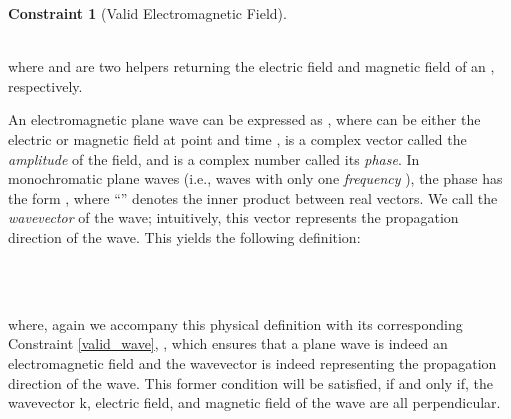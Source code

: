 \documentclass{llncs}
\newtheorem{cons}{Constraint}
\begin{document}
{\begin{cons}[Valid Electromagnetic Field]\  \\
\\
\end{cons}
 \noindent where  and  are two helpers returning the electric field and magnetic field of an , respectively. 
 	

An electromagnetic plane wave can be expressed as
,
where  can be either the electric or magnetic field at point  and time ,
 is a complex vector called the \emph{amplitude} of the field,
and  is a complex number called its \emph{phase}.
In monochromatic plane waves (i.e., waves with only one \emph{frequency} ), the phase  has the form ,
where ``'' denotes the inner product between real vectors.
We call  the \emph{wavevector} of the wave; intuitively, this vector represents the propagation direction of the wave.
This yields the following definition:
\begin{definition} 
 \label{def_planar}\ \vspace{.1cm}\ \\
\ \vspace{.1cm}\\
\end{definition}

\noindent where, again we accompany this physical definition with its corresponding Constraint \ref{valid_wave}, , which ensures that a plane wave  is indeed an electromagnetic field and the wavevector is indeed representing the propagation direction of the wave. This former condition will be satisfied, if and only if, the wavevector \hol k, electric field, and magnetic field of the wave are all perpendicular.  

}
\end{document}
